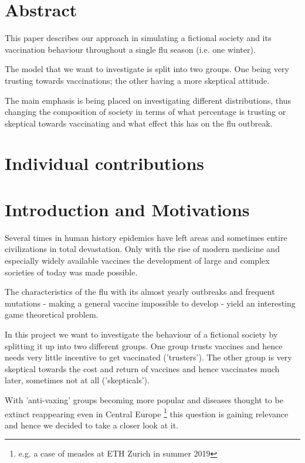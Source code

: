 \documentclass[11pt]{article}
\begin{document}

\tableofcontents

\newpage

\section*{Abstract}
This paper describes our approach in simulating a fictional society and its vaccination behaviour throughout a single flu season (i.e. one winter).

The model that we want to investigate is split into two groups. One being very trusting towards vaccinations; the other having a more skeptical attitude.

The main emphasis is being placed on investigating different distributions, thus changing the composition of society in terms of what percentage is trusting or skeptical towards vaccinating and what effect this has on the flu outbreak.
\newpage


\section{Individual contributions}
\section{Introduction and Motivations}
Several times in human history epidemics have left areas and sometimes entire civilizations in total devastation. Only with the rise of modern medicine and especially widely available vaccines the development of large and complex societies of today was made possible.

The characteristics of the flu with its almost yearly outbreaks and frequent mutations - making a general vaccine impossible to develop - yield an interesting game theoretical problem.

In this project we want to investigate the behaviour of a fictional society by splitting it up into two different groups. One group trusts vaccines and hence needs very little incentive to get vaccinated ('trusters'). The other group is very skeptical towards the cost and return of vaccines and hence vaccinates much later, sometimes not at all ('skepticals').

With 'anti-vaxing' groups becoming more popular and diseases thought to be extinct reappearing even in Central Europe \footnote{e.g. a case of measles at ETH Zurich in summer 2019} this question is gaining relevance and hence we decided to take a closer look at it.
\end{document}

